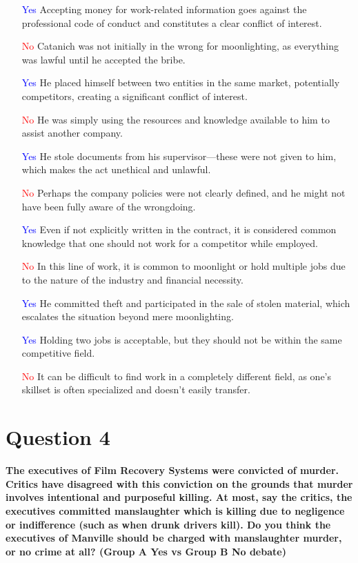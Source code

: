 \documentclass[12pt]{article}
\begin{document}
\begin{itemize}
    \item [\textcolor{blue}{Yes}] Accepting money for work-related information goes against the professional code of conduct and constitutes a clear conflict of interest.
    \item [\textcolor{red}{No}] Catanich was not initially in the wrong for moonlighting, as everything was lawful until he accepted the bribe.
    \item [\textcolor{blue}{Yes}] He placed himself between two entities in the same market, potentially competitors, creating a significant conflict of interest.
    \item [\textcolor{red}{No}] He was simply using the resources and knowledge available to him to assist another company.
    \item [\textcolor{blue}{Yes}] He stole documents from his supervisor—these were not given to him, which makes the act unethical and unlawful.
    \item [\textcolor{red}{No}] Perhaps the company policies were not clearly defined, and he might not have been fully aware of the wrongdoing.
    \item [\textcolor{blue}{Yes}] Even if not explicitly written in the contract, it is considered common knowledge that one should not work for a competitor while employed.
    \item [\textcolor{red}{No}] In this line of work, it is common to moonlight or hold multiple jobs due to the nature of the industry and financial necessity.
    \item [\textcolor{blue}{Yes}] He committed theft and participated in the sale of stolen material, which escalates the situation beyond mere moonlighting.
    \item [\textcolor{blue}{Yes}] Holding two jobs is acceptable, but they should not be within the same competitive field.
    \item [\textcolor{red}{No}] It can be difficult to find work in a completely different field, as one's skillset is often specialized and doesn't easily transfer.
\end{itemize}

\section*{Question 4}
\textbf{The executives of Film Recovery Systems were convicted of murder. Critics have disagreed with this conviction on the grounds that murder involves intentional and purposeful killing. At most, say the critics, the executives committed manslaughter which is killing due to negligence or indifference (such as when drunk drivers kill). Do you think the executives of Manville should be charged with manslaughter murder, or no crime at all? (Group A Yes vs Group B No debate)}
\end{document}
